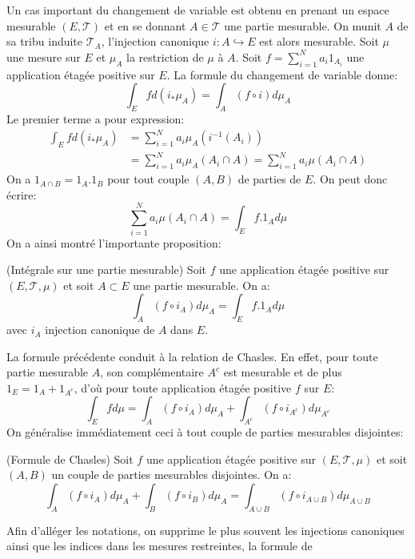 Un cas important du changement de variable est obtenu en prenant un espace
mesurable $(E, \mathcal{T})$ et en se donnant $A \in \mathcal{T}$ une partie
mesurable. On munit $A$ de sa tribu induite $\mathcal{T}_A$, l'injection
canonique $i \colon A \hookrightarrow E$ est alors mesurable.
 Soit $\mu$ une mesure sur $E$ et $\mu_A$ la restriction de $\mu$ à $A$. 
 Soit $f = \sum_{i=1}^N a_i 1_{A_i}$ une application étagée positive sur $E$. La
 formule du changement de variable donne:
\[
\int_E f d(i_*\mu_A) = \int_A (f \circ i) d \mu_A
\]
Le premier terme a pour expression:
\begin{align*}
\int_E f d(i_*\mu_A) & = \sum_{i=1}^N a_i \mu_A\left(i^{-1}(A_i)\right)  \\
& =\sum_{i=1}^N a_i \mu_A\left(A_i \cap A \right) = \sum_{i=1}^N a_i \mu
\left(A_i \cap A \right)
\end{align*}
On a $1_{A\cap B} = 1_A . 1_B$ pour tout couple $(A,B)$ de parties de $E$. On
peut donc écrire:
\[
\sum_{i=1}^N a_i \mu
\left(A_i \cap A \right) = \int_E f . 1_A d\mu
\]
On a ainsi montré l'importante proposition:
\begin{mandatory}
\begin{prop}{(Intégrale sur une partie mesurable)}
Soit $f$ une application étagée positive sur $(E,\mathcal{T},\mu)$ et soit $A
\subset E$ une partie mesurable. On a:
\[
\int_A (f \circ i_A) d \mu_A = \int_E f . 1_A d\mu
\]
avec $i_A$ injection canonique de $A$ dans $E$.
\end{prop}
\end{mandatory}
La formule précédente conduit à la relation de Chasles. En effet, pour toute
partie mesurable $A$, son complémentaire $A^c$ est mesurable et de plus $1_E =
1_A + 1_{A^c}$, d'où pour toute application étagée positive $f$ sur $E$:
\[
\int_E f d \mu = \int_A (f \circ i_A) d \mu_A + \int_{A^c} (f \circ i_{A^c}) d
\mu_{A^c}
\]
On généralise immédiatement ceci à tout couple de parties mesurables disjointes:
\begin{mandatory}
\begin{prop}{(Formule de Chasles)}
Soit $f$ une application étagée positive sur $(E,\mathcal{T},\mu)$ et soit
$(A,B)$ un couple de parties mesurables disjointes. On a:
\[
\int_A (f \circ i_A) d \mu_A  + \int_B (f \circ i_B) d \mu_A= \int_{A\cup B} (f
\circ i_{A\cup B}) d\mu_{A\cup B}
\]
\end{prop}
\end{mandatory}
Afin d'alléger les notations, on supprime le plus souvent les injections
canoniques ainsi que les indices dans les mesures restreintes, la formule de
